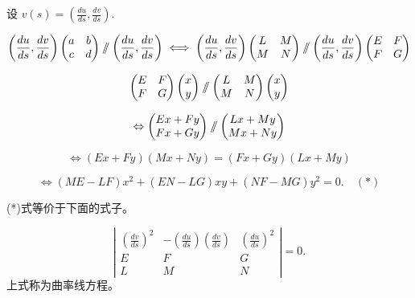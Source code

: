 \documentclass[lang=cn,10pt,thmcnt=section]{elegantbook}
\begin{document}
设 \( v(s) = \left( \frac{du}{ds}, \frac{dv}{ds} \right) \).

\[
\left( \frac{du}{ds}, \frac{dv}{ds} \right) 
\begin{pmatrix}
a & b \\
c & d
\end{pmatrix} 
\mathbin{/\mkern-6mu/} 
\left( \frac{du}{ds}, \frac{dv}{ds} \right) 
\iff 
\left( \frac{du}{ds}, \frac{dv}{ds} \right) 
\begin{pmatrix}
L & M \\
M & N
\end{pmatrix} 
\mathbin{/\mkern-6mu/} 
\left( \frac{du}{ds}, \frac{dv}{ds} \right) 
\begin{pmatrix}
E & F \\
F & G
\end{pmatrix}
\]


\[
\left( \begin{matrix} E & F \\ F & G \end{matrix} \right)
\left( \begin{matrix} x \\ y \end{matrix} \right)
\mathbin{/\mkern-6mu/}
\left( \begin{matrix} L & M \\ M & N \end{matrix} \right)
\left( \begin{matrix} x \\ y \end{matrix} \right)
\]

\[
\Leftrightarrow 
\left( \begin{matrix} Ex + Fy \\ Fx + Gy \end{matrix} \right)
\mathbin{/\mkern-6mu/}
\left( \begin{matrix} Lx + My \\ Mx + Ny \end{matrix} \right)
\]

\[
\Leftrightarrow 
(Ex + Fy)(Mx + Ny) = (Fx + Gy)(Lx + My)
\]

\[
\Leftrightarrow 
(ME - LF)x^2 + (EN - LG)xy + (NF - MG)y^2 = 0. \quad (*)
\]

(*)式等价于下面的式子。

$$\left|\begin{matrix}
    \left(\frac{dv}{ds}\right)^2 & -\left(\frac{du}{ds}\right)\left(\frac{dv}{ds}\right) & \left(\frac{du}{ds}\right)^2 \\
    E & F & G \\
    L & M & N
    \end{matrix}\right| = 0.$$
上式称为曲率线方程。
\end{document}
